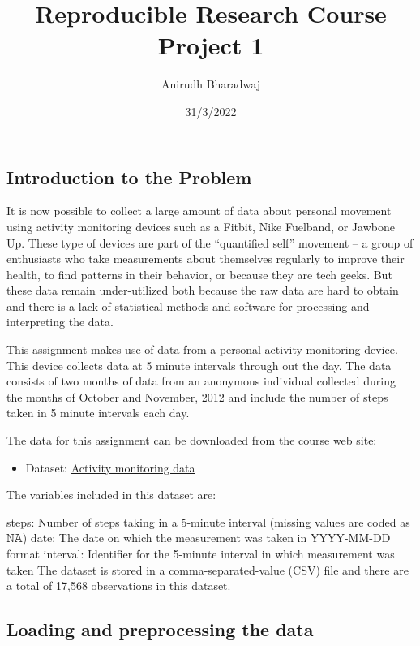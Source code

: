 \documentclass[
]{article}
\title{Reproducible Research Course Project 1}
\author{Anirudh Bharadwaj}
\date{31/3/2022}
\providecommand{\tightlist}{%
  \setlength{\itemsep}{0pt}\setlength{\parskip}{0pt}}
\begin{document}
\maketitle

\hypertarget{introduction-to-the-problem}{%
\subsection{Introduction to the
Problem}\label{introduction-to-the-problem}}

It is now possible to collect a large amount of data about personal
movement using activity monitoring devices such as a Fitbit, Nike
Fuelband, or Jawbone Up. These type of devices are part of the
``quantified self'' movement -- a group of enthusiasts who take
measurements about themselves regularly to improve their health, to find
patterns in their behavior, or because they are tech geeks. But these
data remain under-utilized both because the raw data are hard to obtain
and there is a lack of statistical methods and software for processing
and interpreting the data.

This assignment makes use of data from a personal activity monitoring
device. This device collects data at 5 minute intervals through out the
day. The data consists of two months of data from an anonymous
individual collected during the months of October and November, 2012 and
include the number of steps taken in 5 minute intervals each day.

The data for this assignment can be downloaded from the course web site:

\begin{itemize}
\tightlist
\item
  Dataset:
  \href{https://d396qusza40orc.cloudfront.net/repdata\%2Fdata\%2Factivity.zip}{Activity
  monitoring data}
\end{itemize}

The variables included in this dataset are:

steps: Number of steps taking in a 5-minute interval (missing values are
coded as 𝙽𝙰) date: The date on which the measurement was taken in
YYYY-MM-DD format interval: Identifier for the 5-minute interval in
which measurement was taken The dataset is stored in a
comma-separated-value (CSV) file and there are a total of 17,568
observations in this dataset.

\hypertarget{loading-and-preprocessing-the-data}{%
\subsection{Loading and preprocessing the
data}\label{loading-and-preprocessing-the-data}}
\end{document}
